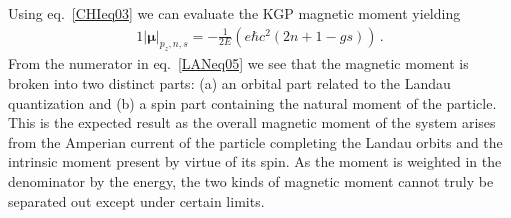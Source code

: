 \documentclass[
aps,
pra,
twocolumn,
showpacs,
preprintnumbers,
amsmath,
amssymb,
footinbib
]{revtex4-2}
\begin{document}
Using eq.~\eqref{CHIeq03} we can evaluate the KGP magnetic moment yielding
\begin{alignat}{1}
  \label{LANeq05} \left|\boldsymbol{\mu}\right|_{p_{z},n,s}=-\frac{1}{2E}\left(e\hbar c^{2}(2n+1-gs)\right)\,.
\end{alignat}
From the numerator in eq.~\eqref{LANeq05} we see that the magnetic moment is broken into two distinct parts: (a) an orbital part related to the Landau quantization and (b) a spin part containing the natural moment of the particle. This is the expected result as the overall magnetic moment of the system arises from the Amperian current of the particle completing the Landau orbits and the intrinsic moment present by virtue of its spin. As the moment is weighted in the denominator by the energy, the two kinds of magnetic moment cannot truly be separated out except under certain limits.
\end{document}
